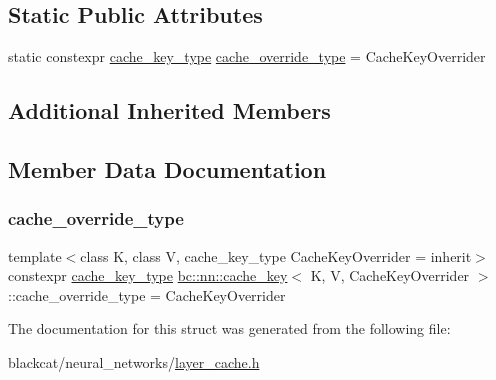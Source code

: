 \subsection*{Static Public Attributes}
\begin{DoxyCompactItemize}
\item 
static constexpr \hyperlink{namespacebc_1_1nn_a6973f1eb052448a0a62bae16c2ffd227}{cache\+\_\+key\+\_\+type} \hyperlink{structbc_1_1nn_1_1cache__key_a8bcfeee208a3c80a137792698bc398fb}{cache\+\_\+override\+\_\+type} = Cache\+Key\+Overrider
\end{DoxyCompactItemize}
\subsection*{Additional Inherited Members}


\subsection{Member Data Documentation}
\mbox{\label{structbc_1_1nn_1_1cache__key_a8bcfeee208a3c80a137792698bc398fb}} 
\subsubsection{\texorpdfstring{cache\+\_\+override\+\_\+type}{cache\_override\_type}}
{\footnotesize\ttfamily template$<$class K, class V, cache\+\_\+key\+\_\+type Cache\+Key\+Overrider = inherit$>$ \\
constexpr \hyperlink{namespacebc_1_1nn_a6973f1eb052448a0a62bae16c2ffd227}{cache\+\_\+key\+\_\+type} \hyperlink{structbc_1_1nn_1_1cache__key}{bc\+::nn\+::cache\+\_\+key}$<$ K, V, Cache\+Key\+Overrider $>$\+::cache\+\_\+override\+\_\+type = Cache\+Key\+Overrider\hspace{0.3cm}{\ttfamily [static]}}



The documentation for this struct was generated from the following file\+:\begin{DoxyCompactItemize}
\item 
blackcat/neural\+\_\+networks/\hyperlink{layer__cache_8h}{layer\+\_\+cache.\+h}\end{DoxyCompactItemize}
